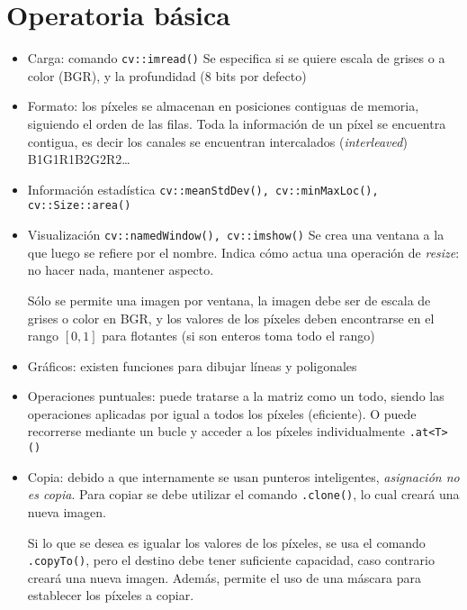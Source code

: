 \documentclass[oneside,a4paper]{book}
\begin{document}
\chapter{Operatoria básica}
	\begin{itemize}
		\item Carga: comando \verb|cv::imread()|
			Se especifica si se quiere escala de grises o a color (BGR),
			y la profundidad (8 bits por defecto)

		\item Formato: los píxeles se almacenan en posiciones contiguas de memoria,
			siguiendo el orden de las filas.
			Toda la información de un píxel se encuentra contigua,
			es decir los canales se encuentran intercalados (\emph{interleaved})
			B1G1R1B2G2R2\ldots

		\item Información estadística
			\verb|cv::meanStdDev(), cv::minMaxLoc(), cv::Size::area()|

		\item Visualización
			\verb|cv::namedWindow(), cv::imshow()|
			Se crea una ventana a la que luego se refiere por el nombre.
			Indica cómo actua una operación de \emph{resize}: no hacer nada, mantener aspecto.

			Sólo se permite una imagen por ventana, la imagen debe ser de escala de grises o color en BGR,
			y los valores de los píxeles deben encontrarse en el rango $[0,1]$ para flotantes (si son enteros toma todo el rango)

		\item Gráficos: existen funciones para dibujar líneas y poligonales

		\item Operaciones puntuales: puede tratarse a la matriz como un todo,
			siendo las operaciones aplicadas por igual a todos los píxeles (eficiente).
			O puede recorrerse mediante un bucle y acceder a los píxeles individualmente \verb|.at<T>()|

		\item Copia: debido a que internamente se usan punteros inteligentes, \emph{asignación no es copia}.
			Para copiar se debe utilizar el comando \verb|.clone()|, lo cual creará una nueva imagen.

			Si lo que se desea es igualar los valores de los píxeles, se usa el comando \verb|.copyTo()|,
			pero el destino debe tener suficiente capacidad, caso contrario creará una nueva imagen.
			Además, permite el uso de una máscara para establecer los píxeles a copiar.


\end{itemize}
\end{document}
